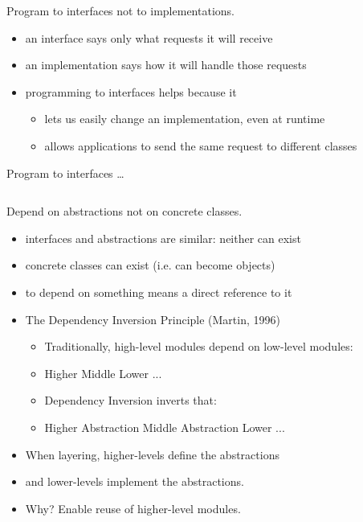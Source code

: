 \documentclass{beamer}
\begin{document}
\begin{frame}{Program to interfaces not to implementations.}
    \begin{itemize}
        \item an interface says only what requests it will receive
        \item an implementation says how it will handle those requests
        \item programming to interfaces helps because it
            \begin{itemize}
                \item lets us easily change an implementation, even at runtime
                \item allows applications to send the same request to different classes
            \end{itemize}
    \end{itemize}
\end{frame}

\begin{frame}{Program to interfaces \ldots}
    \begin{columns}
        \column{\dimexpr\paperwidth-40pt}
        
    \end{columns}
\end{frame}

\begin{frame}{Depend on abstractions not on concrete classes.}
    \begin{itemize}
        \item interfaces and abstractions are similar: neither can exist
        \item concrete classes can exist (i.e. can become objects)
        \item to depend on something means a direct reference to it
        \item The Dependency Inversion Principle (Martin, 1996)
        \begin{itemize}
            \item Traditionally, high-level modules depend on low-level modules:
            \item Higher \textrightarrow{} Middle \textrightarrow{} Lower \textrightarrow{} ...
            \item Dependency Inversion inverts that:
            \item Higher \textrightarrow{} Abstraction \textleftarrow{} Middle \textrightarrow{} Abstraction \textleftarrow{} Lower ...
        \end{itemize}
        \item When layering, higher-levels define the abstractions
        \item and lower-levels implement the abstractions.
        \item Why? Enable reuse of higher-level modules.
    \end{itemize}
\end{frame}
\end{document}
